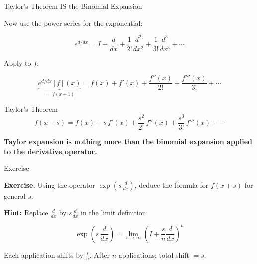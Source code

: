 \documentclass[10pt]{beamer}
\theoremstyle{definition}
\newcommand{\x}[1]{\alert{\textbf{#1}}}
\begin{document}
\begin{frame}{Taylor's Theorem IS the Binomial Expansion}

Now use the power series for the exponential:

$$e^{d/dx} = I + \frac{d}{dx} + \frac{1}{2!}\frac{d^2}{dx^2} + \frac{1}{3!}\frac{d^3}{dx^3} + \cdots$$

\vfill\pause

Apply to $f$:

$$\underbrace{e^{d/dx}[f](x)}_{= \; f(x+1)} = f(x) + f'(x) + \frac{f''(x)}{2!} + \frac{f'''(x)}{3!} + \cdots$$

\vfill\pause

\begin{block}{Taylor's Theorem}
$$\boxed{f(x+s) = f(x) + s\,f'(x) + \frac{s^2}{2!}\,f''(x) + \frac{s^3}{3!}\,f'''(x) + \cdots}$$
\end{block}

\vfill

\x{Taylor expansion is nothing more than the binomial expansion applied to the derivative operator.}

\end{frame}


\begin{frame}{Exercise}

\textbf{Exercise.} Using the operator $\exp\!\left(s\,\frac{d}{dx}\right)$, deduce the formula for $f(x+s)$ for general $s$.

\vfill\pause

\textbf{Hint:} Replace $\frac{d}{dx}$ by $s\frac{d}{dx}$ in the limit definition:

$$\exp\!\left(s\,\frac{d}{dx}\right) = \lim_{n\to\infty}\left(I + \frac{s}{n}\frac{d}{dx}\right)^n$$

Each application shifts by $\frac{s}{n}$. After $n$ applications: total shift $= s$.

\end{frame}


\end{document}
